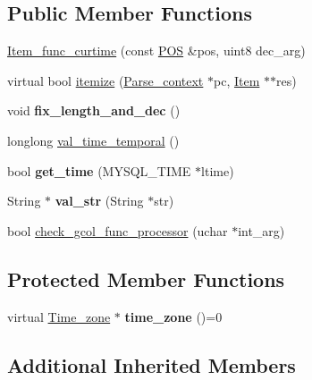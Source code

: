 \subsection*{Public Member Functions}
\begin{DoxyCompactItemize}
\item 
\mbox{\hyperlink{classItem__func__curtime_a879e2c5a9c2f4791640cc19221a7dfd7}{Item\+\_\+func\+\_\+curtime}} (const \mbox{\hyperlink{structYYLTYPE}{P\+OS}} \&pos, uint8 dec\+\_\+arg)
\item 
virtual bool \mbox{\hyperlink{classItem__func__curtime_a2051bac2667b0b2a7de42607accca31f}{itemize}} (\mbox{\hyperlink{structParse__context}{Parse\+\_\+context}} $\ast$pc, \mbox{\hyperlink{classItem}{Item}} $\ast$$\ast$res)
\item 
\mbox{\label{classItem__func__curtime_a31e41948889a9311975afc6d4898eb3d}} 
void {\bfseries fix\+\_\+length\+\_\+and\+\_\+dec} ()
\item 
longlong \mbox{\hyperlink{classItem__func__curtime_a58e6e51156871d1b5e844993c88cf053}{val\+\_\+time\+\_\+temporal}} ()
\item 
\mbox{\label{classItem__func__curtime_aa75f9ba4e06a7efdfc22fb035959764a}} 
bool {\bfseries get\+\_\+time} (M\+Y\+S\+Q\+L\+\_\+\+T\+I\+ME $\ast$ltime)
\item 
\mbox{\label{classItem__func__curtime_a5c03322d92ba114fd44b154b71efd572}} 
String $\ast$ {\bfseries val\+\_\+str} (String $\ast$str)
\item 
bool \mbox{\hyperlink{classItem__func__curtime_af861f93c4face56168852e5cdb465e43}{check\+\_\+gcol\+\_\+func\+\_\+processor}} (uchar $\ast$int\+\_\+arg)
\end{DoxyCompactItemize}
\subsection*{Protected Member Functions}
\begin{DoxyCompactItemize}
\item 
\mbox{\label{classItem__func__curtime_a108b103496e5f9ed8829191d9459595e}} 
virtual \mbox{\hyperlink{classTime__zone}{Time\+\_\+zone}} $\ast$ {\bfseries time\+\_\+zone} ()=0
\end{DoxyCompactItemize}
\subsection*{Additional Inherited Members}


